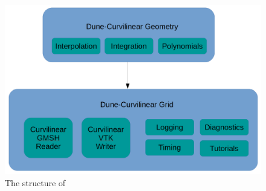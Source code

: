 \begin{figure}[H]
    \centering
    \includegraphics[scale=0.15]{images/curvgrid-map}
    \caption{The structure of \curvgrid{}}
    \label{fig:introduction:curvgrid:structure}
\end{figure}

